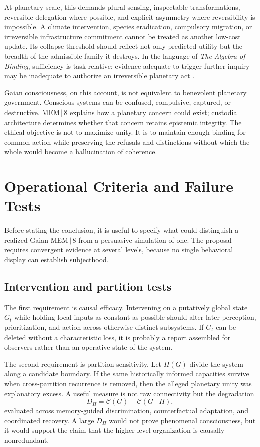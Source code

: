 \documentclass[11pt]{article}
\begin{document}
At planetary scale, this demands plural sensing, inspectable transformations, reversible delegation where possible, and explicit asymmetry where reversibility is impossible. A climate intervention, species eradication, compulsory migration, or irreversible infrastructure commitment cannot be treated as another low-cost update. Its collapse threshold should reflect not only predicted utility but the breadth of the admissible family it destroys. In the language of \emph{The Algebra of Binding}, sufficiency is task-relative: evidence adequate to trigger further inquiry may be inadequate to authorize an irreversible planetary act \cite{flyxionBinding}.

Gaian consciousness, on this account, is not equivalent to benevolent planetary government. Conscious systems can be confused, compulsive, captured, or destructive. MEM\,$|$\,8 explains how a planetary concern could exist; custodial architecture determines whether that concern retains epistemic integrity. The ethical objective is not to maximize unity. It is to maintain enough binding for common action while preserving the refusals and distinctions without which the whole would become a hallucination of coherence.

\section{Operational Criteria and Failure Tests}

Before stating the conclusion, it is useful to specify what could distinguish a realized Gaian MEM\,$|$\,8 from a persuasive simulation of one. The proposal requires convergent evidence at several levels, because no single behavioral display can establish subjecthood.

\subsection{Intervention and partition tests}
\label{sec:partition-tests}

The first requirement is causal efficacy. Intervening on a putatively global state $G_t$ while holding local inputs as constant as possible should alter later perception, prioritization, and action across otherwise distinct subsystems. If $G_t$ can be deleted without a characteristic loss, it is probably a report assembled for observers rather than an operative state of the system.

The second requirement is partition sensitivity. Let $\Pi(G)$ divide the system along a candidate boundary. If the same historically informed capacities survive when cross-partition recurrence is removed, then the alleged planetary unity was explanatory excess. A useful measure is not raw connectivity but the degradation
\[
D_{\Pi}=\mathcal{C}(G)-\mathcal{C}(G\mid \Pi),
\]
evaluated across memory-guided discrimination, counterfactual adaptation, and coordinated recovery. A large $D_{\Pi}$ would not prove phenomenal consciousness, but it would support the claim that the higher-level organization is causally nonredundant.
\end{document}
